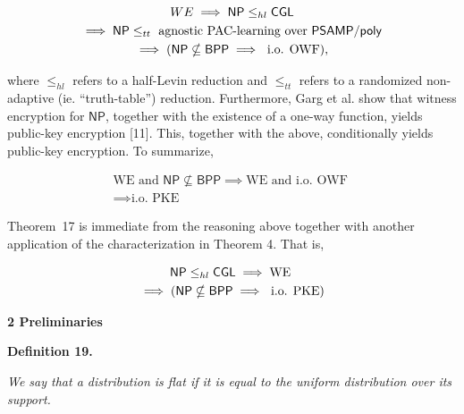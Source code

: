 \documentclass[10pt,a4paper]{article}
\begin{document}
\[\begin{gathered}
WE \displaystyle\implies{\mathsf{NP}}\leq_{hl}{\sf CGL} \\
\displaystyle\implies{\mathsf{NP}}\leq_{tt}\text{ agnostic PAC-learning over }{\mathsf{P}}{\mathsf{SAMP}}/{\mathsf{poly}} \\
\displaystyle\implies({\mathsf{NP}}\nsubseteq{\mathsf{BPP}}\implies\text{ i.o. OWF}),
\end{gathered}\]


where $\leq_{hl}$ refers to a half-Levin reduction and $\leq_{tt}$ refers to a randomized non-adaptive (ie. “truth-table”) reduction. Furthermore, Garg et al. show that witness encryption for ${\mathsf{NP}}$, together with the existence of a one-way function, yields public-key encryption [11]. This, together with the above, conditionally yields public-key encryption. To summarize,\par


\[\begin{gathered}
\displaystyle\text{WE and }{\mathsf{NP}}\nsubseteq{\mathsf{BPP}} \displaystyle\implies\text{WE and i.o. OWF } \\
\displaystyle\implies\text{i.o. PKE}
\end{gathered}\]




Theorem 17 is immediate from the reasoning above together with another application of the characterization in Theorem 4. That is,\par


\[\begin{gathered}
\displaystyle{\mathsf{NP}}\leq_{hl}{\sf CGL} \displaystyle\implies\text{WE } \\
\displaystyle\implies({\mathsf{NP}}\nsubseteq{\mathsf{BPP}}\implies\text{ i.o. PKE})
\end{gathered}\]







\par\medskip\noindent\textbf{
2 Preliminaries}\par





\par\medskip\noindent\textbf{
\textbf{Definition 19}\textbf{.}
}\par



\emph{We say that a distribution is flat if it is equal to the uniform distribution over its support.}\par
\end{document}

